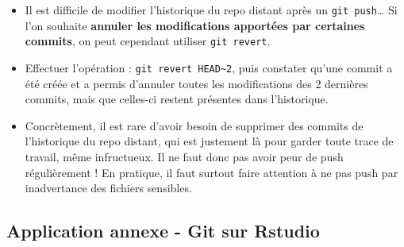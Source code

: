 \documentclass[
  letterpaper,
  DIV=11,
  numbers=noendperiod]{scrartcl}
\providecommand{\tightlist}{%
  \setlength{\itemsep}{0pt}\setlength{\parskip}{0pt}}\usepackage{longtable,booktabs,array}
\begin{document}
\begin{tcolorbox}
\begin{enumerate}
  \begin{itemize}
  \tightlist
  \item
    Il est difficile de modifier l'historique du repo distant après un
    \texttt{git\ push}\ldots{} Si l'on souhaite \textbf{annuler les
    modifications apportées par certaines commits}, on peut cependant
    utiliser \texttt{git\ revert}.
  \item
    Effectuer l'opération :
    \texttt{git\ revert\ HEAD\textasciitilde{}2}, puis constater qu'une
    commit a été créée et a permis d'annuler toutes les modifications
    des 2 dernières commits, mais que celles-ci restent présentes dans
    l'historique.
  \item
    Concrètement, il est rare d'avoir besoin de supprimer des commits de
    l'historique du repo distant, qui est justement là pour garder toute
    trace de travail, même infructueux. Il ne faut donc pas avoir peur
    de push régulièrement ! En pratique, il faut surtout faire attention
    à ne pas push par inadvertance des fichiers sensibles.
  \end{itemize}
\end{enumerate}

\end{tcolorbox}

\hypertarget{application-annexe---git-sur-rstudio}{%
\subsection{Application annexe - Git sur
Rstudio}\label{application-annexe---git-sur-rstudio}}
\end{document}

